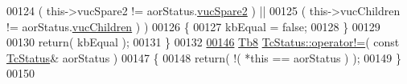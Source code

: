 \begin{DoxyCode}
00124         ( this->vucSpare2       != aorStatus.\mbox{\hyperlink{class_g_n_common_1_1_n_notification_1_1_tc_status_aaee139b3984634b3cc3cc7e2b7175035}{vucSpare2}}       ) ||
00125         ( this->vucChildren     != aorStatus.\mbox{\hyperlink{class_g_n_common_1_1_n_notification_1_1_tc_status_ae398de0e32d0352b0437f4267247fd6d}{vucChildren}}     ) )
00126    \{
00127       kbEqual = \textcolor{keyword}{false};
00128    \}
00129 
00130    \textcolor{keywordflow}{return}( kbEqual );
00131 \}
00132 
\mbox{\hyperlink{class_g_n_common_1_1_n_notification_1_1_tc_status_acdf1eba6040e3cd5e244e21524ff0d86}{00146}} \mbox{\hyperlink{namespace_g_n_common_a8115dc7ed53b6e5b52e6bfde1632ea74}{Tb8}} \mbox{\hyperlink{class_g_n_common_1_1_n_notification_1_1_tc_status_acdf1eba6040e3cd5e244e21524ff0d86}{TcStatus::operator!=}}( \textcolor{keyword}{const} \mbox{\hyperlink{class_g_n_common_1_1_n_notification_1_1_tc_status}{TcStatus}}& aorStatus )
00147 \{
00148    \textcolor{keywordflow}{return}( !( *\textcolor{keyword}{this} == aorStatus ) );
00149 \}
00150 
\end{DoxyCode}
